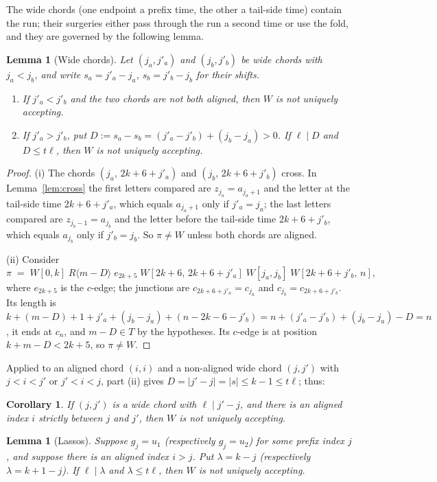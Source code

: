 \documentclass[11pt]{article}
\newtheorem{lemma}[theorem]{Lemma}
\newtheorem{corollary}[theorem]{Corollary}
\theoremstyle{definition}
\begin{document}
The wide chords (one endpoint a prefix time, the other a tail-side time)
contain the run; their surgeries either pass through the run a second time
or use the fold, and they are governed by the following lemma.

\begin{lemma}[Wide chords]\label{lem:wide}
Let $(j_a,j'_a)$ and $(j_b,j'_b)$ be wide chords with $j_a<j_b$, and write
$s_a=j'_a-j_a$, $s_b=j'_b-j_b$ for their shifts.
\begin{enumerate}[leftmargin=2.2em,itemsep=2pt,label=(\roman*)]
\item If $j'_a<j'_b$ and the two chords are not both aligned, then $W$ is not
uniquely accepting.
\item If $j'_a>j'_b$, put $D:=s_a-s_b=(j'_a-j'_b)+(j_b-j_a)>0$. If
$\ell\mid D$ and $D\le t\ell$, then $W$ is not uniquely accepting.
\end{enumerate}
\end{lemma}

\begin{proof}
(i) The chords $(j_a,\,2k+6+j'_a)$ and $(j_b,\,2k+6+j'_b)$ cross. In
Lemma~\ref{lem:cross} the first letters compared are $z_{j_a}=a_{j_a+1}$ and
the letter at the tail-side time $2k+6+j'_a$, which equals $a_{j_a+1}$ only if
$j'_a=j_a$; the last letters compared are $z_{j_b-1}=a_{j_b}$ and the letter
before the tail-side time $2k+6+j'_b$, which equals $a_{j_b}$ only if
$j'_b=j_b$. So $\pi\ne W$ unless both chords are aligned.

(ii) Consider
\[
\pi\;=\;W[0,k]\;R\langle m-D\rangle\;e_{2k+5}\;W[2k+6,\,2k+6+j'_a]\;
W[j_a,j_b]\;W[2k+6+j'_b,\,n],
\]
where $e_{2k+5}$ is the $c$-edge; the junctions are $c_{2k+6+j'_a}=c_{j_a}$
and $c_{j_b}=c_{2k+6+j'_b}$. Its length is
$k+(m-D)+1+j'_a+(j_b-j_a)+(n-2k-6-j'_b)=n+(j'_a-j'_b)+(j_b-j_a)-D=n$, it ends
at $c_n$, and $m-D\in T$ by the hypotheses. Its $c$-edge is at position
$k+m-D<2k+5$, so $\pi\ne W$.
\end{proof}

Applied to an aligned chord $(i,i)$ and a non-aligned wide chord $(j,j')$
with $j<i<j'$ or $j'<i<j$, part (ii) gives $D=|j'-j|=|s|\le k-1\le t\ell$;
thus:

\begin{corollary}\label{cor:foldloop}
If $(j,j')$ is a wide chord with $\ell\mid j'-j$, and there is an aligned
index $i$ strictly between $j$ and $j'$, then $W$ is not uniquely accepting.
\end{corollary}

\begin{lemma}[Lassos]\label{lem:lasso}
Suppose $g_j=u_1$ (respectively $g_j=u_2$) for some prefix index $j$, and
suppose there is an aligned index $i>j$. Put $\lambda=k-j$ (respectively
$\lambda=k+1-j$). If $\ell\mid\lambda$ and $\lambda\le t\ell$, then $W$ is not
uniquely accepting.
\end{lemma}
\end{document}

